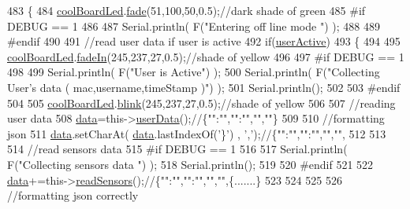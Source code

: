 \begin{DoxyCode}
483 \{
484     \hyperlink{classCoolBoard_a1b1d3c684a5baa56b08486e192fd8e97}{coolBoardLed}.\hyperlink{classCoolBoardLed_af1cacbaa88db8bcf6042c1083ba41155}{fade}(51,100,50,0.5);\textcolor{comment}{//dark shade of green  }
485 \textcolor{preprocessor}{#if DEBUG == 1  }
486     
487     Serial.println( F(\textcolor{stringliteral}{"Entering off line mode "}) ); 
488     
489 \textcolor{preprocessor}{#endif}
490 
491     \textcolor{comment}{//read user data if user is active}
492     \textcolor{keywordflow}{if}(\hyperlink{classCoolBoard_a6395459131d6889a3005f79c7a35e964}{userActive})
493     \{
494 
495         \hyperlink{classCoolBoard_a1b1d3c684a5baa56b08486e192fd8e97}{coolBoardLed}.\hyperlink{classCoolBoardLed_ab778f5e7bed0ab74e3906d82110493c3}{fadeIn}(245,237,27,0.5);\textcolor{comment}{//shade of yellow}
496 
497 \textcolor{preprocessor}{    #if DEBUG == 1}
498         
499         Serial.println( F(\textcolor{stringliteral}{"User is Active"}) );
500         Serial.println( F(\textcolor{stringliteral}{"Collecting User's data ( mac,username,timeStamp )"}) );
501         Serial.println();
502 
503 \textcolor{preprocessor}{    #endif}
504 
505         \hyperlink{classCoolBoard_a1b1d3c684a5baa56b08486e192fd8e97}{coolBoardLed}.\hyperlink{classCoolBoardLed_a96e1ea13003eee34c9dbcef340404426}{blink}(245,237,27,0.5);\textcolor{comment}{//shade of yellow   }
506 
507         \textcolor{comment}{//reading user data}
508         \hyperlink{classCoolBoard_a427fb753dd8575bdf821c70a5c63d695}{data}=this->\hyperlink{classCoolBoard_ae7358fb6e623cfc81b775f5f1734909b}{userData}();\textcolor{comment}{//\{"":"","":"","",""\}}
509 
510         \textcolor{comment}{//formatting json }
511         \hyperlink{classCoolBoard_a427fb753dd8575bdf821c70a5c63d695}{data}.setCharAt( \hyperlink{classCoolBoard_a427fb753dd8575bdf821c70a5c63d695}{data}.lastIndexOf(\textcolor{charliteral}{'\}'}) , \textcolor{charliteral}{','});\textcolor{comment}{//\{"":"","":"","","",}
512         
513                 
514         \textcolor{comment}{//read sensors data}
515 \textcolor{preprocessor}{    #if DEBUG == 1}
516 
517         Serial.println( F(\textcolor{stringliteral}{"Collecting sensors data "}) );
518         Serial.println();
519 
520 \textcolor{preprocessor}{    #endif}
521 
522         \hyperlink{classCoolBoard_a427fb753dd8575bdf821c70a5c63d695}{data}+=this->\hyperlink{classCoolBoard_ad03abdce2e65f520bbf2cff0f2d083cf}{readSensors}();\textcolor{comment}{//\{"":"","":"","","",\{.......\}}
523 
524         
525 
526         \textcolor{comment}{//formatting json correctly}

\end{DoxyCode}
